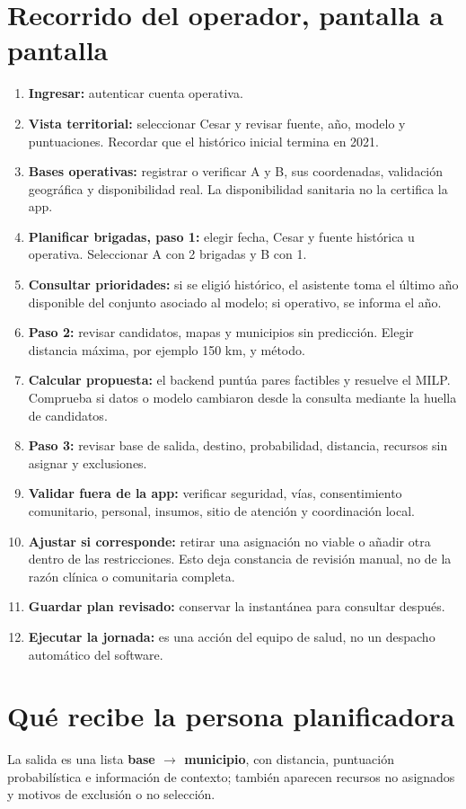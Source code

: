 \documentclass[11pt,a4paper]{report}
\begin{document}
\section{Recorrido del operador, pantalla a pantalla}
\begin{enumerate}
\item \textbf{Ingresar:} autenticar cuenta operativa.
\item \textbf{Vista territorial:} seleccionar Cesar y revisar fuente, año, modelo y puntuaciones. Recordar que el histórico inicial termina en 2021.
\item \textbf{Bases operativas:} registrar o verificar A y B, sus coordenadas, validación geográfica y disponibilidad real. La disponibilidad sanitaria no la certifica la app.
\item \textbf{Planificar brigadas, paso 1:} elegir fecha, Cesar y fuente histórica u operativa. Seleccionar A con 2 brigadas y B con 1.
\item \textbf{Consultar prioridades:} si se eligió histórico, el asistente toma el último año disponible del conjunto asociado al modelo; si operativo, se informa el año.
\item \textbf{Paso 2:} revisar candidatos, mapas y municipios sin predicción. Elegir distancia máxima, por ejemplo 150 km, y método.
\item \textbf{Calcular propuesta:} el backend puntúa pares factibles y resuelve el MILP. Comprueba si datos o modelo cambiaron desde la consulta mediante la huella de candidatos.
\item \textbf{Paso 3:} revisar base de salida, destino, probabilidad, distancia, recursos sin asignar y exclusiones.
\item \textbf{Validar fuera de la app:} verificar seguridad, vías, consentimiento comunitario, personal, insumos, sitio de atención y coordinación local.
\item \textbf{Ajustar si corresponde:} retirar una asignación no viable o añadir otra dentro de las restricciones. Esto deja constancia de revisión manual, no de la razón clínica o comunitaria completa.
\item \textbf{Guardar plan revisado:} conservar la instantánea para consultar después.
\item \textbf{Ejecutar la jornada:} es una acción del equipo de salud, no un despacho automático del software.
\end{enumerate}

\section{Qué recibe la persona planificadora}
La salida es una lista \textbf{base $\rightarrow$ municipio}, con distancia, puntuación probabilística e información de contexto; también aparecen recursos no asignados y motivos de exclusión o no selección.
\end{document}
